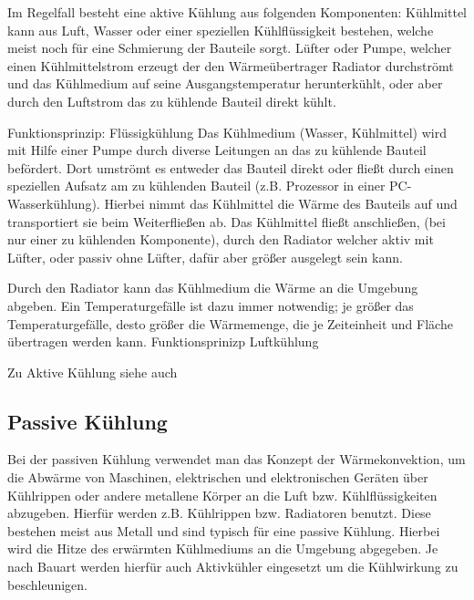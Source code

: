 Im Regelfall besteht eine aktive Kühlung aus folgenden Komponenten:
Kühlmittel kann aus Luft, Wasser oder einer speziellen Kühlflüssigkeit bestehen, welche meist noch für eine Schmierung der Bauteile sorgt.
Lüfter oder Pumpe, welcher einen Kühlmittelstrom erzeugt der den Wärmeübertrager Radiator durchströmt und das Kühlmedium auf seine Ausgangstemperatur herunterkühlt, oder aber durch den Luftstrom das zu kühlende Bauteil direkt kühlt.

Funktionsprinzip: Flüssigkühlung
Das Kühlmedium (Wasser, Kühlmittel) wird mit Hilfe einer Pumpe durch diverse Leitungen an das zu kühlende Bauteil befördert. Dort umströmt es entweder das Bauteil direkt oder fließt durch einen speziellen Aufsatz am zu kühlenden Bauteil (z.B. Prozessor in einer PC-Wasserkühlung).
Hierbei nimmt das Kühlmittel die Wärme des Bauteils auf und transportiert sie beim Weiterfließen ab.
Das Kühlmittel fließt anschließen, (bei nur einer zu kühlenden Komponente), durch den Radiator welcher aktiv mit Lüfter, oder passiv ohne Lüfter, dafür aber größer ausgelegt sein kann.

Durch den Radiator kann das Kühlmedium die Wärme an die Umgebung abgeben. Ein Temperaturgefälle ist dazu immer notwendig; je größer das Temperaturgefälle, desto größer die Wärmemenge, die je Zeiteinheit und Fläche übertragen werden kann.
Funktionsprinizp Luftkühlung

Zu Aktive Kühlung siehe auch \cite{AktiveKuehlung}



\subsection{Passive Kühlung} 

Bei der passiven Kühlung verwendet man das Konzept der Wärmekonvektion, um die Abwärme von Maschinen, elektrischen und elektronischen Geräten über Kühlrippen oder andere metallene Körper an die Luft bzw. Kühlflüssigkeiten abzugeben.
Hierfür werden z.B. Kühlrippen bzw. Radiatoren benutzt. Diese bestehen meist aus Metall und sind typisch für eine passive Kühlung. Hierbei wird die Hitze des erwärmten Kühlmediums an die Umgebung abgegeben. Je nach Bauart werden hierfür auch Aktivkühler eingesetzt um die Kühlwirkung zu beschleunigen.

